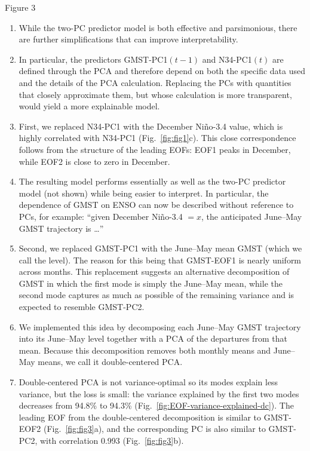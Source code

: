 \documentclass[aspectratio=169,xcolor=dvipsnames]{beamer}
\begin{document}
\begin{frame}{Figure 3}
  \begin{enumerate}\fontsize{5pt}{7pt}\selectfont

  \item While the two-PC predictor model is both effective and
    parsimonious, there are further simplifications that can improve
    interpretability.

  \item In particular, the predictors GMST-PC1$(t-1)$ and N34-PC1$(t)$
    are defined through the PCA and therefore depend on both the
    specific data used and the details of the PCA
    calculation. Replacing the PCs with quantities that closely
    approximate them, but whose calculation is more transparent, would
    yield a more explainable model.

  \item First, we replaced N34-PC1 with the December Ni\~no-3.4 value,
    which is highly correlated with N34-PC1 (Fig.\
    \ref{fig:fig1}c). This close correspondence follows from the
    structure of the leading EOFs: EOF1 peaks in December, while EOF2
    is close to zero in December.

  \item The resulting model performs essentially as well as the two-PC
    predictor model (not shown) while being easier to interpret. In
    particular, the dependence of GMST on ENSO can now be described
    without reference to PCs, for example: ``given December Ni\~no-3.4
    $=x$, the anticipated June--May GMST trajectory is \ldots''
  
  \item Second, we replaced GMST-PC1 with the June--May mean GMST
    (which we call the level). The reason for this being that
    GMST-EOF1 is nearly uniform across months. This replacement
    suggests an alternative  decomposition of GMST in which the first mode is simply
    the June--May mean, while the second mode captures as much as
    possible of the remaining variance and is expected to resemble
    GMST-PC2.

  \item We implemented this idea by decomposing each June--May GMST
    trajectory into its June--May level together with a PCA of the
    departures from that mean. Because this decomposition removes both
    monthly means and June--May means, we call it double-centered PCA.
    
  \item Double-centered PCA is not variance-optimal so its modes
    explain less variance, but the loss is small: the variance
    explained by the first two modes decreases from 94.8\% to 94.3\%
    (Fig.\ \ref{fig:EOF-variance-explained-dc}). The leading EOF from
    the double-centered decomposition is similar to GMST-EOF2 (Fig.\
    \ref{fig:fig3}a), and the corresponding PC is also similar to
    GMST-PC2, with correlation 0.993 (Fig.\ \ref{fig:fig3}b).


\end{enumerate}
\end{frame}
\end{document}
